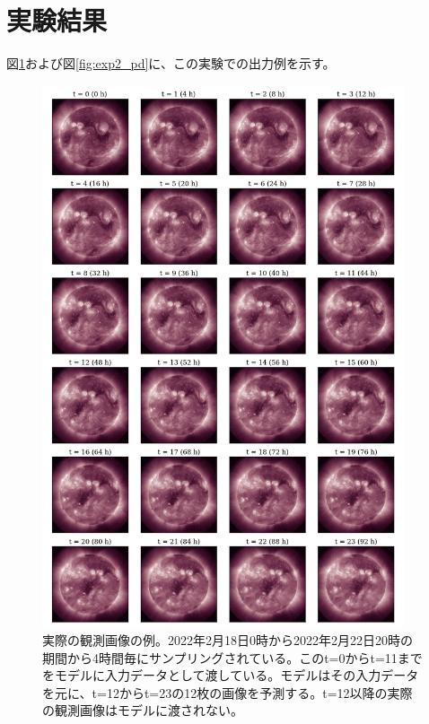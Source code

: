   \section{実験結果}
    図\ref{fig:exp2_gt}および図\ref{fig:exp2_pd}に、この実験での出力例を示す。

    \begin{figure}[htbp]
      \centering
      \includegraphics[width=0.95\textwidth]{figures/exp2/gt.png}
      \caption{実際の観測画像の例。2022年2月18日0時から2022年2月22日20時の期間から4時間毎にサンプリングされている。このt=0からt=11までをモデルに入力データとして渡している。モデルはその入力データを元に、t=12からt=23の12枚の画像を予測する。t=12以降の実際の観測画像はモデルに渡されない。}
      \label{fig:exp2_gt}
    \end{figure}

